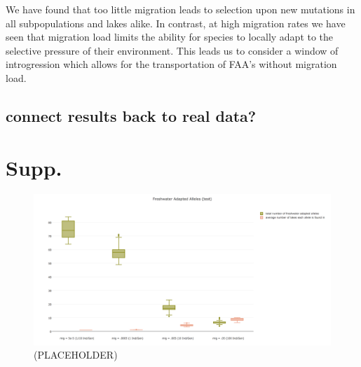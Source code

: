 \documentclass{article}
\newcommand{\plr}[1]{\todo[linecolor=blue,backgroundcolor=blue!25,bordercolor=blue]{#1}}
\begin{document}
We have found that too little migration leads to selection upon new mutations in all subpopulations and lakes alike. 
In contrast, at high migration rates we have seen that migration load limits 
the ability for species to locally adapt to the selective pressure of their environment.
This leads us to consider a window of introgression which allows for the transportation
of FAA's without migration load. 


\subsection*{connect results back to real data?}




\clearpage

{}

\section{Supp.}

\begin{figure}
	\begin{center}
  		\includegraphics[width=\linewidth]{plotlyPlots/NumFAA.png}
  		\caption{(PLACEHOLDER)}
		\label{fig:NumFAA}
	\end{center}
\end{figure}
\end{document}
